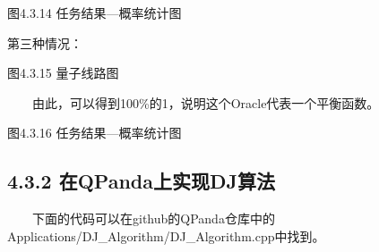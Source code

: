 \documentclass[a4paper,11pt,english]{sphinxmanual}
\begin{document}
\begin{center}图4.3.14 任务结果—概率统计图
\end{center}
\sphinxAtStartPar
第三种情况：


\begin{center}图4.3.15 量子线路图
\end{center}
\sphinxAtStartPar
  由此，可以得到100\%的1，说明这个Oracle代表一个平衡函数。


\begin{center}图4.3.16 任务结果—概率统计图
\end{center}

\subsection{4.3.2 在QPanda上实现DJ算法}
\label{\detokenize{rst/4.3Deutsch-Josza_u7b97_u6cd5:qpandadj}}
\sphinxAtStartPar
  下面的代码可以在github的QPanda仓库中的Applications/DJ\_Algorithm/DJ\_Algorithm.cpp中找到。
\end{document}
